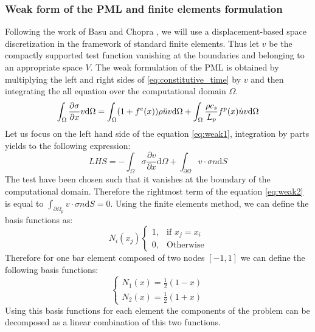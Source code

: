 \subsubsection{Weak form of the PML and finite elements formulation}
Following the work of Basu and Chopra \cite{Basu2003}, we will use a displacement-based space discretization in the framework of standard finite elements. Thus let $v$ be the compactly supported test function vanishing at the boundaries and belonging to an appropriate space $V$. The weak formulation of the PML is obtained by multiplying the left and right sides of \ref{eq:constitutive_time} by $v$ and then integrating the all equation over the computational domain $\Omega$. 
\begin{equation}
    \int_{\Omega} \frac{\partial \sigma}{\partial x} v \mathrm{d}\Omega =  \int_{\Omega}  (1+f^e(x))\rho \Ddot{u} v \mathrm{d}\Omega + \int_{\Omega}  \frac{\rho c_s}{L_p} f^p(x) \Dot{u}v \mathrm{d}\Omega
     \label{eq:weak1}
\end{equation}
Let us focus on the left hand side of the equation \ref{eq:weak1}, integration by parts yields to the following expression:
\begin{equation}
    LHS = -\int_{\Omega}\sigma \frac{\partial v }{\partial x} \mathrm{d}\Omega + \int_{\partial \Omega} v \cdot \sigma n \mathrm{d}S
    \label{eq:weak2}
\end{equation}
The test have been chosen such that it vanishes at the boundary of the computational domain. Therefore the rightmost term of the equation \ref{eq:weak2} is equal to $\int_{\partial \Omega_p} v \cdot \sigma n \mathrm{d}S= 0$. Using the finite elements method, we can define the basis functions as:
\begin{equation}
    N_i(x_j) \begin{cases}
               1, & \text{if $x_j = x_i $}\\
               0, & \text{Otherwise}
            \end{cases} 
\end{equation}
Therefore for one bar element composed of two nodes $[-1, 1]$ we can define the following basis functions:
\begin{equation}
\begin{cases}
   N_1(x) = \frac{1}{2}(1-x)\\
   N_2(x) = \frac{1}{2}(1+x)
\end{cases} 
\end{equation}
Using this basis functions for each element the components of the problem can be decomposed as a linear combination of this two functions.
